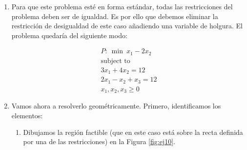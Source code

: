 \documentclass[11pt,table]{article}
\begin{document}
    \begin{enumerate}
        \item Para que este problema esté en forma estándar, todas las restricciones del problema deben ser de igualdad. Es por ello que debemos eliminar la restricción de desigualdad de este caso añadiendo una variable de holgura. El problema quedaría del siguiente modo:

        \begin{align*}
            P: \ \min \ x_{1} - 2x_{2}\\
            \text{subject to} \\
            3x_{1} + 4x_{2} = 12 \\
            2x_{1} - x_{2} + x_{3} = 12\\
            x_{1},x_{2},x_{3} \geq 0
            \end{align*}

            \item Vamos ahora a resolverlo geométricamente. Primero, identificamos los elementos:
            \begin{enumerate}
            \item Dibujamos la región factible (que en este caso está sobre la recta definida por una de las restricciones) en la Figura \ref{fig:ej10}.
            \begin{figure}
                

\end{figure}
\end{enumerate}
\end{enumerate}
\end{document}
